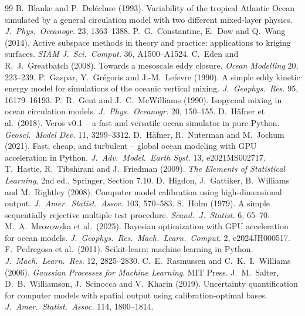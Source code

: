 \documentclass[11pt,a4paper]{article}
\begin{document}
\begin{thebibliography}{99}\small
\setlength{\itemsep}{0pt}
 B.~Blanke and P.~Del\'ecluse (1993). Variability of the tropical Atlantic Ocean simulated by a
  general circulation model with two different mixed-layer physics. \emph{J.\ Phys.\ Oceanogr.} 23, 1363--1388.
 P.~G.~Constantine, E.~Dow and Q.~Wang (2014). Active subspace methods in theory and
  practice: applications to kriging surfaces. \emph{SIAM J.\ Sci.\ Comput.} 36, A1500--A1524.
 C.~Eden and R.~J.~Greatbatch (2008). Towards a mesoscale eddy closure. \emph{Ocean Modelling}
  20, 223--239.
 P.~Gaspar, Y.~Gr\'egoris and J.-M.~Lefevre (1990). A simple eddy kinetic energy model for
  simulations of the oceanic vertical mixing. \emph{J.\ Geophys.\ Res.} 95, 16179--16193.
 P.~R.~Gent and J.~C.~McWilliams (1990). Isopycnal mixing in ocean circulation models.
  \emph{J.\ Phys.\ Oceanogr.} 20, 150--155.
 D.~H\"afner et al.\ (2018). Veros v0.1 -- a fast and versatile ocean simulator in pure
  Python. \emph{Geosci.\ Model Dev.} 11, 3299--3312.
 D.~H\"afner, R.~Nuterman and M.~Jochum (2021). Fast, cheap, and turbulent -- global ocean
  modeling with GPU acceleration in Python. \emph{J.\ Adv.\ Model.\ Earth Syst.} 13, e2021MS002717.
 T.~Hastie, R.~Tibshirani and J.~Friedman (2009). \emph{The Elements of Statistical Learning},
  2nd ed., Springer, Section 7.10.
 D.~Higdon, J.~Gattiker, B.~Williams and M.~Rightley (2008). Computer model calibration using
  high-dimensional output. \emph{J.\ Amer.\ Statist.\ Assoc.} 103, 570--583.
 S.~Holm (1979). A simple sequentially rejective multiple test procedure. \emph{Scand.\ J.\
  Statist.} 6, 65--70.
 M.~A.~Mrozowska et al.\ (2025). Bayesian optimization with GPU acceleration for ocean
  models. \emph{J.\ Geophys.\ Res.\ Mach.\ Learn.\ Comput.} 2, e2024JH000517.
\bibitem{pedregosa2011} F.~Pedregosa et al.\ (2011). Scikit-learn: machine learning in Python. \emph{J.\ Mach.\
  Learn.\ Res.} 12, 2825--2830.
\bibitem{rasmussen2006} C.~E.~Rasmussen and C.~K.~I.~Williams (2006). \emph{Gaussian Processes for Machine
  Learning}. MIT Press.
\bibitem{salter2019} J.~M.~Salter, D.~B.~Williamson, J.~Scinocca and V.~Kharin (2019). Uncertainty quantification
  for computer models with spatial output using calibration-optimal bases. \emph{J.\ Amer.\ Statist.\ Assoc.}
  114, 1800--1814.
\end{thebibliography}
\end{document}
